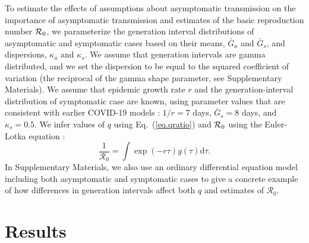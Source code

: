 \documentclass[12pt]{article}
\newcommand{\req}[1]{(\ref{#1})}
\begin{document}
To estimate the effects of assumptions about asymptomatic transmission on the importance of asymptomatic transmission and estimates of the basic reproduction number ${\cal{R}}_0$, we parameterize the generation interval distributions of asymptomatic and symptomatic cases based on their means, $\bar G_a$ and $\bar G_s$, and dispersions, $\kappa_a$ and $\kappa_s$.
We assume that generation intervals are gamma distributed, and we set the dispersion to be equal to the squared coefficient of variation (the reciprocal of the gamma shape parameter, see Supplementary Materials).
We assume that epidemic growth rate $r$ and the generation-interval distribution of symptomatic case are known, using parameter values that are consistent with earlier COVID-19 models \cite{park_preprint}: $1/r=7$ days, $\bar G_s=8$ days, and $\kappa_s=0.5$.
We infer values of $q$ using Eq.~\req{eq.qratio} and ${\cal{R}}_0$ using the Euler-Lotka equation \cite{lotka1907relation}:
\begin{equation}
\frac{1}{\mathcal R_0} = \int \exp(-r \tau) g(\tau) \mathrm{d} \tau.
\end{equation}
In Supplementary Materials, we also use an ordinary differential equation model including both asymptomatic and symptomatic cases to give a concrete example of how differences in generation intervals affect both $q$ and estimates of $\mathcal R_0$.

\section{Results}
\end{document}
